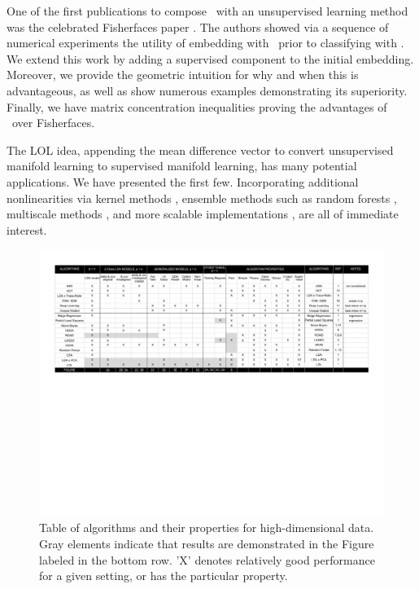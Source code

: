 \documentclass[10pt]{article}
\begin{document}
One of the first publications to compose \Fld~with an unsupervised learning method was the celebrated Fisherfaces paper \cite{Belhumeur1997}.  The authors showed via a sequence of numerical experiments the utility of embedding with \Pca~prior to classifying with \Fld.  We extend this work by adding a supervised component to the initial embedding.  Moreover, we provide the geometric intuition for why and when this is advantageous, as well as show numerous examples demonstrating its superiority.  Finally, we have matrix concentration inequalities proving the advantages of \Lol~over Fisherfaces.  


The LOL idea, appending the mean difference vector to convert unsupervised manifold learning to supervised manifold learning, has many potential applications.  We have presented the first few.  Incorporating additional nonlinearities via kernel methods \cite{Mika1999}, ensemble methods such as random forests \cite{Breiman2001}, multiscale methods \cite{Allard12a},  and more scalable implementations \cite{Chang2011}, are all of immediate interest.


\clearpage

\begin{figure}
\centering
\includegraphics[width=1\linewidth,trim=0.5in 4.5in 0.5in 0.5in,clip=true]{../Figs/table.pdf} %
\caption{Table of algorithms and their properties for high-dimensional data. Gray elements indicate that results are demonstrated in the Figure labeled in the bottom row. 'X' denotes relatively good performance for a given setting, or has the particular property.
}
\label{fig:table}
\end{figure}
\end{document}
